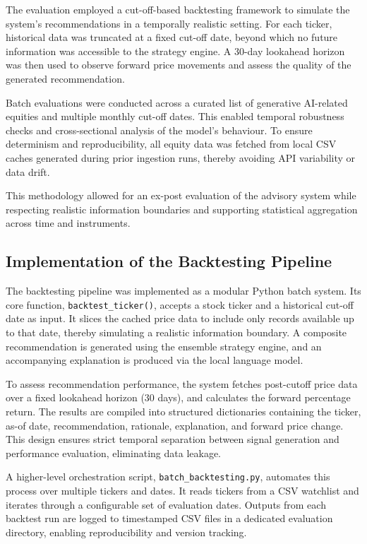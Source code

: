 The evaluation employed a cut-off-based backtesting framework to simulate the system’s recommendations in a temporally realistic setting. For each ticker, historical data was truncated at a fixed cut-off date, beyond which no future information was accessible to the strategy engine. A 30-day lookahead horizon was then used to observe forward price movements and assess the quality of the generated recommendation.

Batch evaluations were conducted across a curated list of generative AI-related equities and multiple monthly cut-off dates. This enabled temporal robustness checks and cross-sectional analysis of the model’s behaviour. To ensure determinism and reproducibility, all equity data was fetched from local CSV caches generated during prior ingestion runs, thereby avoiding API variability or data drift.

This methodology allowed for an ex-post evaluation of the advisory system while respecting realistic information boundaries and supporting statistical aggregation across time and instruments.

\subsection{Implementation of the Backtesting Pipeline}

The backtesting pipeline was implemented as a modular Python batch system. Its core function, \texttt{backtest\_ticker()}, accepts a stock ticker and a historical cut-off date as input. It slices the cached price data to include only records available up to that date, thereby simulating a realistic information boundary. A composite recommendation is generated using the ensemble strategy engine, and an accompanying explanation is produced via the local language model.

To assess recommendation performance, the system fetches post-cutoff price data over a fixed lookahead horizon (30 days), and calculates the forward percentage return. The results are compiled into structured dictionaries containing the ticker, as-of date, recommendation, rationale, explanation, and forward price change. This design ensures strict temporal separation between signal generation and performance evaluation, eliminating data leakage.

A higher-level orchestration script, \texttt{batch\_backtesting.py}, automates this process over multiple tickers and dates. It reads tickers from a CSV watchlist and iterates through a configurable set of evaluation dates. Outputs from each backtest run are logged to timestamped CSV files in a dedicated evaluation directory, enabling reproducibility and version tracking.

